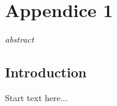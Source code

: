 \graphicspath{{chapt_dutch/}{intro/}{chapt2/}{chapt3/}{chapt4/}{chapt5/}}

\renewcommand\evenpagerightmark{{\scshape\small Appendix A}}
\renewcommand\oddpageleftmark{{\scshape\small Grid Computing: The Next Network Challenge!}}


\hyphenation{}

\chapter[Appendice 1]%
{Appendice 1}
\label{app1}


\emph{
abstract
}

\section{Introduction}
Start text here...



\clearpage{\pagestyle{empty}\cleardoublepage}
